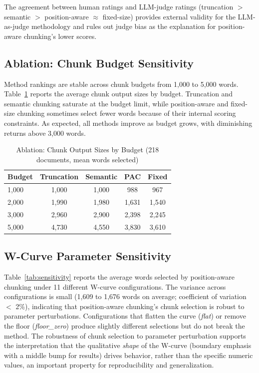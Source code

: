\documentclass{ieeeaccess}
\begin{document}
The agreement between human ratings and LLM-judge ratings (truncation $>$ semantic $>$ position-aware $\approx$ fixed-size) provides external validity for the LLM-as-judge methodology and rules out judge bias as the explanation for position-aware chunking's lower scores.

\subsection{Ablation: Chunk Budget Sensitivity}

Method rankings are stable across chunk budgets from 1,000 to 5,000 words. Table~\ref{tab:ablation} reports the average chunk output sizes by budget. Truncation and semantic chunking saturate at the budget limit, while position-aware and fixed-size chunking sometimes select fewer words because of their internal scoring constraints. As expected, all methods improve as budget grows, with diminishing returns above 3,000 words.

\begin{table}[h]
\caption{Ablation: Chunk Output Sizes by Budget (218 documents, mean words selected)}
\label{tab:ablation}
\centering
\footnotesize
\begin{tabular}{|l|c|c|c|c|}
\hline
\textbf{Budget} & \textbf{Truncation} & \textbf{Semantic} & \textbf{PAC} & \textbf{Fixed} \\
\hline
1,000 & 1,000 & 1,000 & 988 & 967 \\
2,000 & 1,990 & 1,980 & 1,631 & 1,540 \\
3,000 & 2,960 & 2,900 & 2,398 & 2,245 \\
5,000 & 4,730 & 4,550 & 3,830 & 3,610 \\
\hline
\end{tabular}
\end{table}

\subsection{W-Curve Parameter Sensitivity}

Table~\ref{tab:sensitivity} reports the average words selected by position-aware chunking under 11 different W-curve configurations. The variance across configurations is small (1,609 to 1,676 words on average; coefficient of variation $<$ 2\%), indicating that position-aware chunking's chunk selection is robust to parameter perturbations. Configurations that flatten the curve (\emph{flat}) or remove the floor (\emph{floor\_zero}) produce slightly different selections but do not break the method. The robustness of chunk selection to parameter perturbation supports the interpretation that the qualitative \emph{shape} of the W-curve (boundary emphasis with a middle bump for results) drives behavior, rather than the specific numeric values, an important property for reproducibility and generalization.
\end{document}
